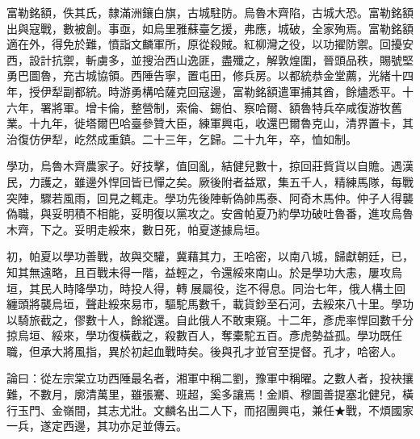 \begin{pinyinscope}
富勒銘額，佚其氏，隸滿洲鑲白旗，古城駐防。烏魯木齊陷，古城大恐。富勒銘額出與寇戰，數被創。事亟，如烏里雅蘇臺乞援，弗應，城破，全家殉焉。富勒銘額適在外，得免於難，憤詣文麟軍所，原從殺賊。紅柳灣之役，以功擢防禦。回擾安西，設計抗禦，斬虜多，並搜治西山逸匪，盡殲之，解敦煌圍，晉頭品秩，賜號堅勇巴圖魯，充古城協領。西陲告寧，置屯田，修兵房。以都統恭金堂薦，光緒十四年，授伊犁副都統。時游勇構哈薩克回寇邊，富勒銘額遣軍捕其酋，餘燼悉平。十六年，署將軍。增卡倫，整營制，索倫、錫伯、察哈爾、額魯特兵卒咸復游牧舊業。十九年，徙塔爾巴哈臺參贊大臣，練軍興屯，收還巴爾魯克山，清界置卡，其治復仿伊犁，屹然成重鎮。二十三年，乞歸。二十九年，卒，恤如制。

學功，烏魯木齊農家子。好技擊，值回亂，結健兒數十，掠回莊貲貨以自贍。遇漢民，力護之，雖邊外悍回皆已憚之矣。厥後附者益眾，集五千人，精練馬隊，每戰突陣，驟若風雨，回見之輒走。學功先後陣斬偽帥馬泰、阿奇木馬仲。仲子人得襲偽職，與妥明積不相能，妥明復以黨攻之。安酋帕夏乃約學功破吐魯番，進攻烏魯木齊，下之。妥明走綏來，數日死，帕夏遂據烏垣。

初，帕夏以學功善戰，故與交驩，冀藉其力，王哈密，以南八城，歸獻朝廷，已，知其無遠略，且百戰未得一階，益輕之，令還綏來南山。於是學功大恚，屢攻烏垣，其民人時降學功，時投人得，轉展屬役，迄不得息。同治七年，俄人構土回纏頭將襲烏垣，聲赴綏來易市，驅駝馬數千，載貨鈔至石河，去綏來八十里。學功以騎旅截之，僇數十人，餘縱還。自此俄人不敢東窺。十二年，彥虎率悍回數千分掠烏垣、綏來，學功復橫截之，殺數百人，奪橐駝五百。彥虎勢益孤。學功既任職，但承大將風指，異於初起血戰時矣。後與孔才並官至提督。孔才，哈密人。

論曰：從左宗棠立功西陲最名者，湘軍中稱二劉，豫軍中稱曜。之數人者，投袂攘難，不數月，廓清萬里，雖張騫、班超，奚多讓焉！金順、穆圖善提塞北健兒，橫行玉門、金嶺間，其志尤壯。文麟名出二人下，而招團興屯，兼任★戰，不煩國家一兵，遂定西邊，其功亦足並傳云。


\end{pinyinscope}